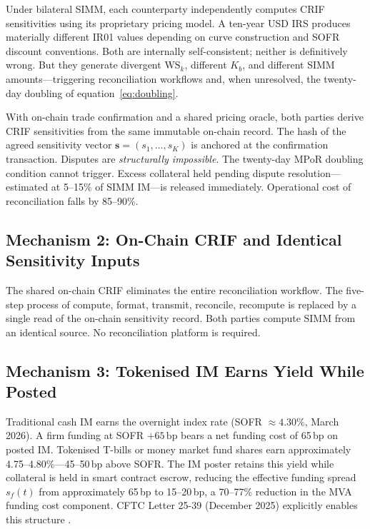 \documentclass[12pt,letterpaper]{article}
\numberwithin{equation}{section}
\theoremstyle{remark}
\newcommand{\WS}{\mathrm{WS}}
\newcommand{\Kb}{K_b}
\begin{document}
Under bilateral SIMM, each counterparty independently computes CRIF
sensitivities using its proprietary pricing model. A ten-year USD IRS
produces materially different IR01 values depending on curve construction
and SOFR discount conventions. Both are internally self-consistent; neither
is definitively wrong. But they generate divergent $\WS_k$, different
$\Kb$, and different SIMM amounts---triggering reconciliation workflows and,
when unresolved, the twenty-day doubling of equation~\eqref{eq:doubling}.

With on-chain trade confirmation and a shared pricing oracle, both parties
derive CRIF sensitivities from the same immutable on-chain record. The hash
of the agreed sensitivity vector $\bm{s} = (s_1, \ldots, s_K)$ is anchored
at the confirmation transaction. Disputes are \emph{structurally impossible}.
The twenty-day MPoR doubling condition cannot trigger. Excess collateral held
pending dispute resolution---estimated at 5--15\% of SIMM IM---is released
immediately. Operational cost of reconciliation falls by 85--90\%.

\subsection{Mechanism 2: On-Chain CRIF and Identical Sensitivity Inputs}

The shared on-chain CRIF eliminates the entire reconciliation workflow.
The five-step process of compute, format, transmit, reconcile, recompute is
replaced by a single read of the on-chain sensitivity record. Both parties
compute SIMM from an identical source. No reconciliation platform is required.

\subsection{Mechanism 3: Tokenised IM Earns Yield While Posted}

Traditional cash IM earns the overnight index rate (SOFR $\approx 4.30\%$,
March 2026). A firm funding at SOFR $+ 65\,\mathrm{bp}$ bears a net
funding cost of 65\,bp on posted IM. Tokenised T-bills or money market fund
shares earn approximately 4.75--4.80\%---45--50\,bp above SOFR. The IM
poster retains this yield while collateral is held in smart contract escrow,
reducing the effective funding spread $s_f(t)$ from approximately 65\,bp to
15--20\,bp, a 70--77\% reduction in the MVA funding cost component.
CFTC Letter 25-39 (December 2025) explicitly enables this structure
\citep{cftc_2025}.
\end{document}
